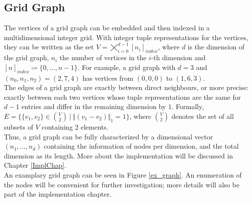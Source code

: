 \subsection{Grid Graph}
\label{gridgraphst}
The vertices of a grid graph can be embedded and then indexed in a multidimensional integer grid. With integer tuple representations for the vertices, they can be written as the set $V=\bigtimes_{i=0}^{d-1}[n_i]_{index}$, where $d$ is the dimension of the grid graph, $n_i$ the number of vertices in the $i$-th dimension and $[n]_{index}\coloneqq \{0,...,n-1\}$. For example, a grid graph with $d=3$ and $(n_0,n_1,n_2)=(2,7,4)$ has vertices from $(0,0,0)$ to $(1,6,3)$.\\
The edges of a grid graph are exactly between direct neighbours, or more precise: exactly between each two vertices whose tuple representations are the same for $d-1$ entries and differ in the remaining dimension by $1$. Formally, $E=\{\{v_1,v_2\}\in \binom{V}{2}~\vert~ \Vert (v_1-v_2)\Vert_1 = 1\}$, where $\binom{V}{2}$ denotes the set of all subsets of $V$ containing $2$ elements.\\
Thus, a grid graph can be fully characterized by a dimensional vector $(n_1,...,n_d)$ containing the information of nodes per dimension, and the total dimension as its length. More about the implementation will be discussed in Chapter \ref{ImplChap}.\\
An examplary grid graph can be seen in Figure \ref{ex_graph}. An enumeration of the nodes will be convenient for further investigation; more details will also be part of the implementation chapter.

